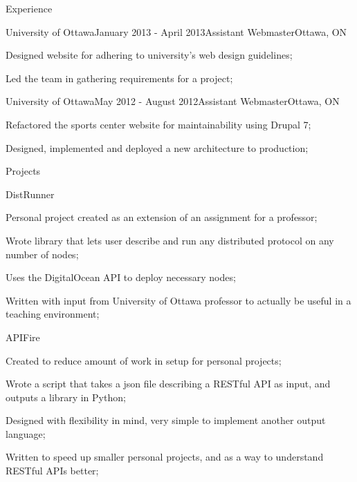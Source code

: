 \documentclass{resume} %
\begin{document}
\begin{rSection}{Experience}

\begin{rSubsection}{University of Ottawa}{January 2013 - April 2013}{Assistant Webmaster}{Ottawa, ON}
\item Designed website for adhering to university's web design guidelines;
\item Led the team in gathering requirements for a project;
\end{rSubsection}


\begin{rSubsection}{University of Ottawa}{May 2012 - August 2012}{Assistant Webmaster}{Ottawa, ON}
\item Refactored the sports center website for maintainability using Drupal 7;
\item Designed, implemented and deployed a new architecture to production;
\end{rSubsection}

\end{rSection}


\begin{rSection}{Projects}

\begin{rSubsection}{DistRunner}{}{}{}
\item Personal project created as an extension of an assignment for a professor;
\item Wrote library that lets user describe and run any distributed protocol on any number of nodes;
\item Uses the DigitalOcean API to deploy necessary nodes;
\item Written with input from University of Ottawa professor to actually be useful in a teaching environment;
\end{rSubsection}

\begin{rSubsection}{APIFire}{}{}{}
\item Created to reduce amount of work in setup for personal projects;
\item Wrote a script that takes a json file describing a RESTful API as input, and outputs a library in Python;
\item Designed with flexibility in mind, very simple to implement another output language;
\item Written to speed up smaller personal projects, and as a way to understand RESTful APIs better;
\end{rSubsection}

\end{rSection}
\end{document}
